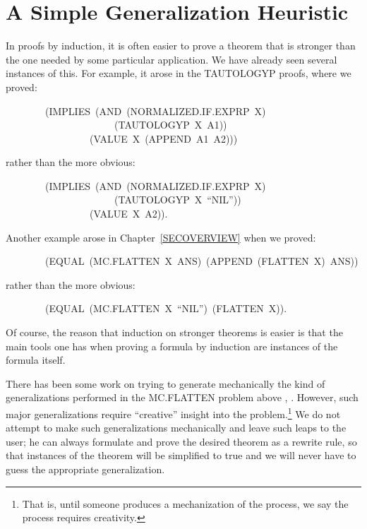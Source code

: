 \documentclass[11pt]{book}
\newenvironment{pubasis}{\begin{flushleft}\ttfamily\small}{\normalsize\rmfamily\end{flushleft}}
\newcommand{\pubdefaulttextsize}{\large}
\begin{document}
\section{A Simple Generalization Heuristic}
\pubdefaulttextsize
In proofs by induction, it is often easier to prove a theorem that is
stronger than the one needed by some particular application.  We have already seen
several instances of this.  For example, it arose in the TAUTOLOGYP
proofs, where we proved:
\begin{pubasis}
~~~~~~~~(IMPLIES~(AND~(NOR\-MAL\-IZED.IF.EXPRP~X)\\
~~~~~~~~~~~~~~~~~~~~~~(TAUTOLOGYP~X~A1))\\
~~~~~~~~~~~~~~~~~(VALUE~X~(APPEND~A1~A2)))\\
\end{pubasis}
rather than the more obvious:
\begin{pubasis}
~~~~~~~~(IMPLIES~(AND~(NOR\-MAL\-IZED.IF.EXPRP~X)\\
~~~~~~~~~~~~~~~~~~~~~~(TAUTOLOGYP~X~``NIL''))\\
~~~~~~~~~~~~~~~~~(VALUE~X~A2)).\\
\end{pubasis}
Another example arose in Chapter~\ref{SECOVERVIEW}
when we proved:
\begin{pubasis}
~~~~~~~~(EQUAL~(MC.FLAT\-TEN~X~ANS)~(APPEND~(FLAT\-TEN~X)~ANS))\\
\end{pubasis}
rather than the more obvious:
\begin{pubasis}
~~~~~~~~(EQUAL~(MC.FLAT\-TEN~X~``NIL'')~(FLAT\-TEN~X)).\\
\end{pubasis}
Of course, the reason that  induction on stronger theorems is easier is
that the main tools one has when proving a formula by induction
are instances of the formula itself.

There has been some work on trying to generate mechanically 
the kind of generalizations performed in the MC.FLAT\-TEN
problem above \cite{IEEE}, \cite{AUBIN}.  However,
such major generalizations require ``creative'' insight into the
problem.\footnote{That is, until someone produces a mechanization of the process, we say the process requires creativity.}
We do not attempt to make such generalizations mechanically and
leave such leaps to the user; he can always formulate and prove the desired theorem as a rewrite
rule, so that instances of
the theorem will be simplified to true and we will never have to guess the appropriate generalization.
\end{document}
